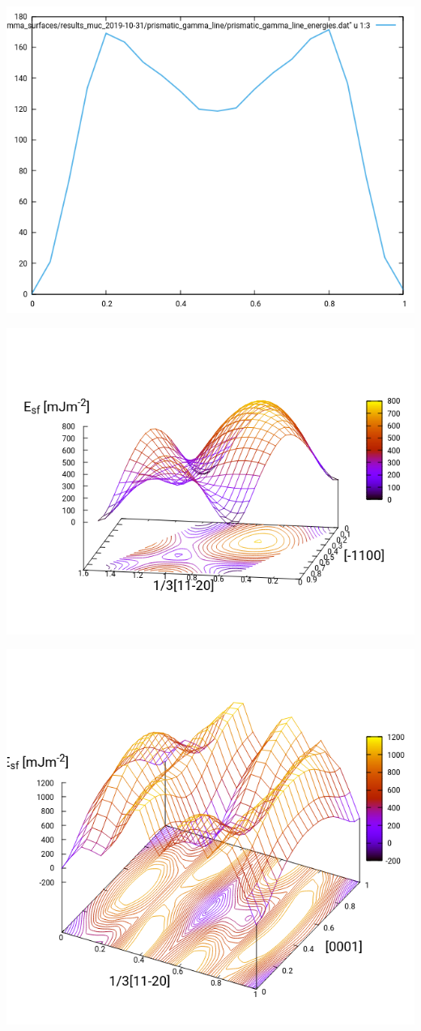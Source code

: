 \documentclass[11pt]{article}
\begin{document}
\begin{center}
\includegraphics[width=.9\linewidth]{Images/prismatic_gamma_line_2019-10-31_no_omega_ord_model.png}
\end{center}
\begin{center}
\includegraphics[width=.9\linewidth]{Images/basal_gs_noo_2019-10-29.png}
\end{center}
\begin{center}
\includegraphics[width=.9\linewidth]{Images/pyramidal_gs_noo_2019-11-08_alat.png}
\end{center}
\end{document}
